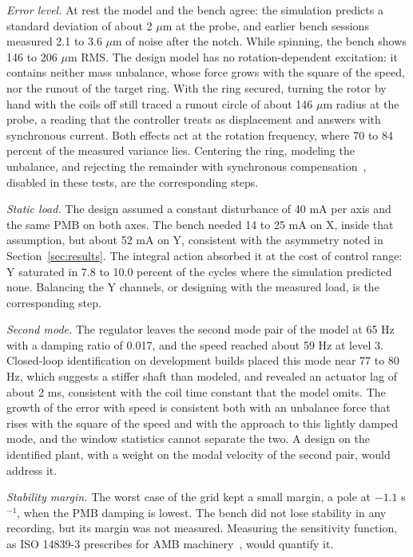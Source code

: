 \documentclass[conference]{IEEEtran}
\begin{document}
\emph{Error level.} At rest the model and the bench agree: the simulation predicts a standard deviation of about 2 $\mu$m at the probe, and earlier bench sessions measured 2.1 to 3.6 $\mu$m of noise after the notch. While spinning, the bench shows 146 to 206 $\mu$m RMS. The design model has no rotation-dependent excitation: it contains neither mass unbalance, whose force grows with the square of the speed, nor the runout of the target ring. With the ring secured, turning the rotor by hand with the coils off still traced a runout circle of about 146 $\mu$m radius at the probe, a reading that the controller treats as displacement and answers with synchronous current. Both effects act at the rotation frequency, where 70 to 84 percent of the measured variance lies. Centering the ring, modeling the unbalance, and rejecting the remainder with synchronous compensation~\cite{zhao2026constraint}, disabled in these tests, are the corresponding steps.

\emph{Static load.} The design assumed a constant disturbance of 40 mA per axis and the same PMB on both axes. The bench needed 14 to 25 mA on X, inside that assumption, but about 52 mA on Y, consistent with the asymmetry noted in Section~\ref{sec:results}. The integral action absorbed it at the cost of control range: Y saturated in 7.8 to 10.0 percent of the cycles where the simulation predicted none. Balancing the Y channels, or designing with the measured load, is the corresponding step.

\emph{Second mode.} The regulator leaves the second mode pair of the model at 65 Hz with a damping ratio of 0.017, and the speed reached about 59 Hz at level 3. Closed-loop identification on development builds placed this mode near 77 to 80 Hz, which suggests a stiffer shaft than modeled, and revealed an actuator lag of about 2 ms, consistent with the coil time constant that the model omits. The growth of the error with speed is consistent both with an unbalance force that rises with the square of the speed and with the approach to this lightly damped mode, and the window statistics cannot separate the two. A design on the identified plant, with a weight on the modal velocity of the second pair, would address it.

\emph{Stability margin.} The worst case of the grid kept a small margin, a pole at $-1.1$ s$^{-1}$, when the PMB damping is lowest. The bench did not lose stability in any recording, but its margin was not measured. Measuring the sensitivity function, as ISO 14839-3 prescribes for AMB machinery~\cite{iso14839_3}, would quantify it.
\end{document}
